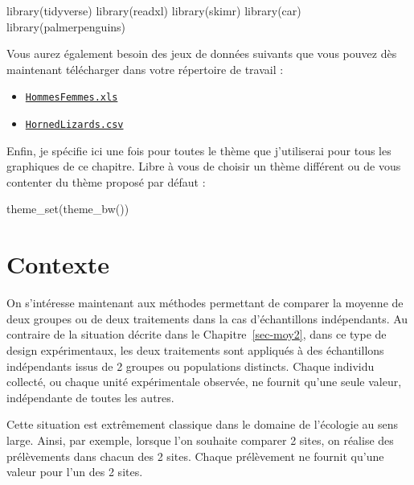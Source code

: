 \documentclass[
  french,
  a4paper,
  DIV=11,
  numbers=noendperiod,
  oneside]{scrreprt}
\newenvironment{Shaded}{}{}
\newcommand{\FunctionTok}[1]{\textcolor[rgb]{0.44,0.26,0.76}{#1}}
\newcommand{\NormalTok}[1]{\textcolor[rgb]{0.14,0.16,0.18}{#1}}
\providecommand{\tightlist}{%
  \setlength{\itemsep}{0pt}\setlength{\parskip}{0pt}}
\begin{document}
\begin{Shaded}
\begin{Highlighting}[]
\FunctionTok{library}\NormalTok{(tidyverse)}
\FunctionTok{library}\NormalTok{(readxl)}
\FunctionTok{library}\NormalTok{(skimr)}
\FunctionTok{library}\NormalTok{(car)}
\FunctionTok{library}\NormalTok{(palmerpenguins)}
\end{Highlighting}
\end{Shaded}

Vous aurez également besoin des jeux de données suivants que vous pouvez
dès maintenant télécharger dans votre répertoire de travail :

\begin{itemize}
\tightlist
\item
  \href{data/HommesFemmes.xls}{\texttt{HommesFemmes.xls}}
\item
  \href{data/HornedLizards.csv}{\texttt{HornedLizards.csv}}
\end{itemize}

Enfin, je spécifie ici une fois pour toutes le thème que j'utiliserai
pour tous les graphiques de ce chapitre. Libre à vous de choisir un
thème différent ou de vous contenter du thème proposé par défaut :

\begin{Shaded}
\begin{Highlighting}[]
\FunctionTok{theme\_set}\NormalTok{(}\FunctionTok{theme\_bw}\NormalTok{())}
\end{Highlighting}
\end{Shaded}

\section{Contexte}\label{contexte-2}

On s'intéresse maintenant aux méthodes permettant de comparer la moyenne
de deux groupes ou de deux traitements dans la cas d'échantillons
indépendants. Au contraire de la situation décrite dans le
Chapitre~\ref{sec-moy2}, dans ce type de design expérimentaux, les deux
traitements sont appliqués à des échantillons indépendants issus de 2
groupes ou populations distincts. Chaque individu collecté, ou chaque
unité expérimentale observée, ne fournit qu'une seule valeur,
indépendante de toutes les autres.

Cette situation est extrêmement classique dans le domaine de l'écologie
au sens large. Ainsi, par exemple, lorsque l'on souhaite comparer 2
sites, on réalise des prélèvements dans chacun des 2 sites. Chaque
prélèvement ne fournit qu'une valeur pour l'un des 2 sites.
\end{document}
